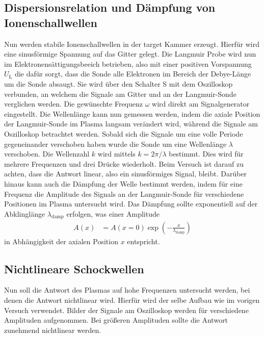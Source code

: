 \subsection{Dispersionsrelation und D\"ampfung von Ionenschallwellen}
Nun werden stabile Ionenschallwellen in der target Kammer erzeugt.
Hierf\"ur wird eine sinusf\"ormige Spannung auf das Gitter gelegt.
Die Langmuir Probe wird nun im Elektronens\"attigungsbeeich betrieben, also mit einer positiven Vorspannung $U_\text{L}$ die daf\"ur sorgt, dass die Sonde alle Elektronen im Bereich der Debye-L\"ange um die Sonde absaugt.
Sie wird \"uber den Schalter S mit dem Oszilloskop verbunden, an welchem die Signale am Gitter und an der Langmuir-Sonde verglichen werden.
Die gew\"unschte Frequenz $\omega$ wird direkt am Signalgenerator eingestellt.
Die Wellenl\"ange kann nun gemessen werden, indem die axiale Position der Langmuir-Sonde im Plasma langsam ver\"andert wird, w\"ahrend die Signale am Oszilloskop betrachtet werden.
Sobald sich die Signale um eine volle Periode gegeneinander verschoben haben wurde die Sonde um eine Wellenl\"ange $\lambda$ verschoben.
Die Wellenzahl $k$ wird mittels $k=2\pi/\lambda$ bestimmt.
Dies wird f\"ur mehrere Frequenzen und drei Dr\"ucke wiederholt.
Beim Versuch ist darauf zu achten, dass die Antwort linear, also ein sinusf\"ormiges Signal, bleibt.
Dar\"uber hinaus kann auch die D\"ampfung der Welle bestimmt werden, indem f\"ur eine Frequenz die Amplitude des Signals an der Langmuir-Sonde f\"ur verschiedene Positionen im Plasma untersucht wird.
Das D\"ampfung sollte exponentiell auf der Abklingl\"ange $\lambda_\text{damp}$ erfolgen, was einer Amplitude
\begin{align}
A(x)
    &=A(x=0)\exp(-\frac{x}{\lambda_\text{damp}})
    \label{eq:A}
\end{align}
in Abh\"angigkeit der axialen Position $x$ entspricht.

\subsection{Nichtlineare Schockwellen}
Nun soll die Antwort des Plasmas auf hohe Frequenzen untersucht werden, bei denen die Antwort nichtlinear wird.
Hierf\"ur wird der selbe Aufbau wie im vorigen Versuch verwendet.
Bilder der Signale am Oszilloskop werden f\"ur verschiedene Amplituden aufgenommen.
Bei gr\"o\ss eren Amplituden sollte die Antwort zunehmend nichtlinear werden.
\cite{anleitung2}
\FloatBarrier
